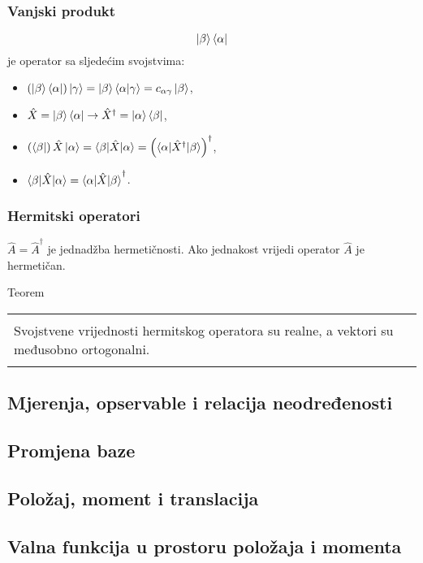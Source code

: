 \documentclass{article}
\numberwithin{equation}{section}
\newenvironment{thm}[1]
    {\begin{center}
    #1\\[1ex]
    \begin{tabular}{|p{0.9\textwidth}|}
    \hline\\
    }
    { 
    \\\\\hline
    \end{tabular} 
    \end{center}
    }
\begin{document}
\subsubsection{Vanjski produkt}
\begin{equation}
	\ket{\beta}\bra{\alpha}
\end{equation}
je operator sa sljedećim svojstvima:
\begin{itemize}
	\item $\left(\ket{\beta}\bra{\alpha}\right)\ket{\gamma} = \ket{\beta}\braket{\alpha|\gamma} = c_{\alpha\gamma}\ket{\beta}$,
	\item $\hat{X} = \ket{\beta}\bra{\alpha} \rightarrow \hat{X}^{\dagger} = \ket{\alpha}\bra{\beta}$,
	\item $\left(\bra{\beta}\right)\hat{X}\ket{\alpha} = \braket{\beta|\hat{X}|\alpha} = \left(\braket{\alpha|\hat{X}^{\dagger}|\beta}\right)^{\dagger}$,
	\item $\braket{\beta|\hat{X}|\alpha} = \braket{\alpha|\hat{X}|\beta}^{\dagger}$.
\end{itemize}
\subsubsection{Hermitski operatori}
 $\hat{A} = \hat{A}^{\dagger}$ je jednadžba hermetičnosti. Ako jednakost vrijedi operator $\hat{A}$ je hermetičan.
 \begin{thm}{Teorem}
	 Svojstvene vrijednosti hermitskog operatora su realne, a vektori su međusobno ortogonalni.
 \end{thm}



\subsection{Mjerenja, opservable i relacija neodređenosti}

\subsection{Promjena baze}

\subsection{Položaj, moment i translacija}

\subsection{Valna funkcija u prostoru položaja i momenta}
\end{document}
